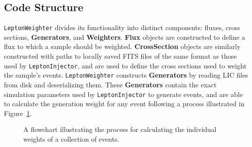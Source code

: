 \documentclass[main.tex]{subfiles}
\newcommand{\LeptonInjector}{\texttt{LeptonInjector}}
\newcommand{\LeptonWeighter}{\texttt{LeptonWeighter}}
\begin{document}
\subsection{Code Structure\label{sec:lw_code}}

\LeptonWeighter{} divides its functionality into distinct components: fluxes, cross sections, \textbf{Generators}, and \textbf{Weighters}. 
\textbf{Flux} objects are constructed to define a flux to which a sample should be weighted.
\textbf{CrossSection} objects are similarly constructed with paths to locally saved FITS files of the same format as those used by \LeptonInjector{}, and are used to define the cross sections used to weight the sample's events.
\LeptonWeighter{} constructs \textbf{Generators} by reading LIC files from disk and deserializing them.
These \textbf{Generators} contain the exact simulation parameters used by \LeptonInjector{} to generate events, and are able to calculate the generation weight for any event following a process illustrated in Figure~\ref{fig:LWflow}.

\begin{figure}[p]
    \centering
    \caption{A flowchart illustrating the process for calculating the individual weights of a collection of events.}
    \label{fig:LWflow}
\end{figure}
\end{document}
